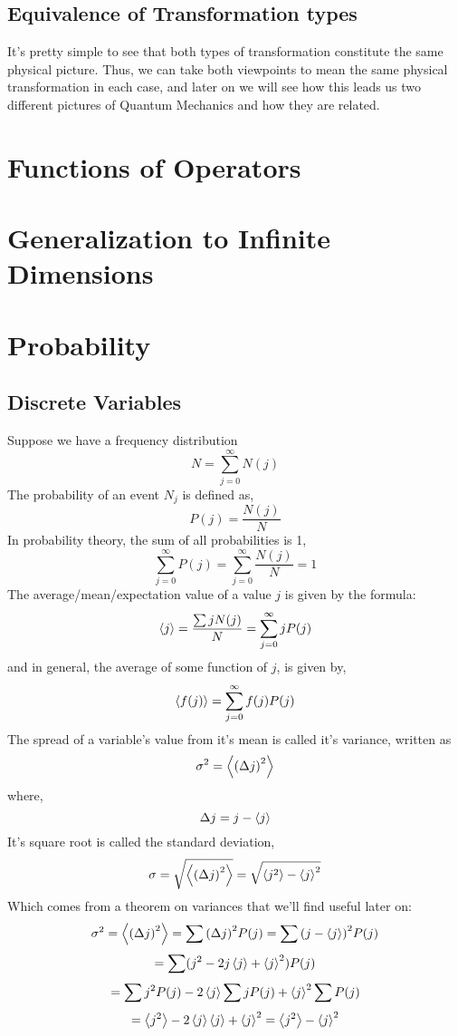 \subsection{Equivalence of Transformation types}
It's pretty simple to see that both types of transformation constitute the same physical picture. Thus, we can take both viewpoints to mean the same physical transformation in each case, and later on we will see how this leads us two different pictures of Quantum Mechanics and how they are related.
\section{Functions of Operators}
\section{Generalization to Infinite Dimensions}
\section{Probability}
\subsection{Discrete Variables}
Suppose we have a frequency distribution 
\begin{equation}
N = \sum_{j=0}^{\infty} N(j)
\end{equation}
The probability of an event $N_{j}$ is defined as,
\begin{equation}
P(j) = \frac{N(j)}{N}
\end{equation}
In probability theory, the sum of all probabilities is 1,
\begin{equation}
\sum_{j = 0}^{\infty}P(j) = \sum_{j = 0}^{\infty}\frac{N(j)}{N} = 1
\end{equation}
The average/mean/expectation value of a value $j$ is given by the formula:
\begin{equation}
	\expval{j} = \frac{\sum j N(j)}{N} = \sum_{j =0 }^{\infty} j P(j)
\end{equation}
and in general, the average of some function of $j$, is given by,
\begin{equation}
\expval{f(j)} = \sum_{j =0 }^{\infty} f(j) P(j)
\end{equation}
The spread of a variable's value from it's mean is called it's variance, written as
\begin{equation}
\sigma^{2} = \expval{{(\Delta j)}^{2}}
\end{equation}
where,
$$\Delta j = j - \expval{j}$$
It's square root is called the standard deviation,
\begin{equation}
\sigma = \sqrt{\expval{{(\Delta j)}^{2}}} =  \sqrt{\expval{j^{2}} - \expval{j}^{2}}
\end{equation}
Which comes from a theorem on variances that we'll find useful later on:
$$\sigma^{2} = \expval{{(\Delta j)}^{2}} = \sum {(\Delta j)}^{2} P(j) = \sum {(j- \expval{j})}^{2} P(j)$$
$$ = \sum (j^{2} - 2j \expval{j} + \expval{j}^{2}) P(j)$$
$$ = \sum j^{2}P(j) - 2 \expval{j} \sum jP(j) + \expval{j}^{2}\sum P(j)$$
$$ = \expval{j^{2}} - 2 \expval{j}\expval{j} + \expval{j}^{2} = \expval{j^{2}} - \expval{j}^{2}$$
